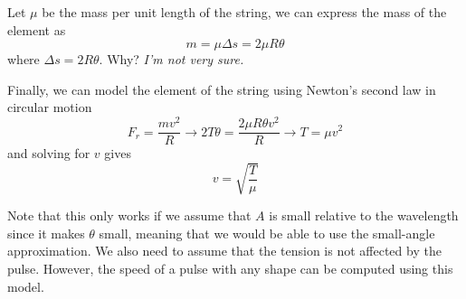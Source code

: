 Let $\mu$ be the mass per unit length of the string, we can express the mass of the element as 
\[ m = \mu\Delta s = 2\mu R\theta \]
where $\Delta s = 2R\theta$. Why? \textit{I'm not very sure.}

Finally, we can model the element of the string using Newton's second law in circular motion 
\[ F_r = \frac{mv^2}{R} \rightarrow 2T\theta = \frac{2\mu R\theta v^2}{R} \rightarrow T = \mu v^2 \]
and solving for $v$ gives
\begin{equation}\label{16.18}
    v = \sqrt{\frac{T}{\mu}}
\end{equation}

Note that this only works if we assume that $A$ is small relative to the wavelength since it makes
$\theta$ small, meaning that we would be able to use the small-angle approximation. We also need 
to assume that the tension is not affected by the pulse. However, the speed of a pulse with any shape
can be computed using this model.